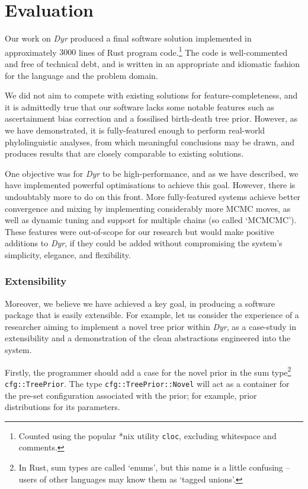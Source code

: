 \documentclass[10pt,journal,compsoc]{IEEEtran}
\begin{document}
\section{Evaluation}

Our work on \textit{Dyr} produced a final software solution implemented in approximately $3000$ lines of Rust program code.\footnote{Counted using the popular *nix utility \texttt{cloc}, excluding whitespace and comments.} The code is well-commented and free of technical debt, and is written in an appropriate and idiomatic fashion for the language and the problem domain.

We did not aim to compete with existing solutions for feature-completeness, and it is admittedly true that our software lacks some notable features such as ascertainment bias correction and a fossilised birth-death tree prior. However, as we have demonstrated, it is fully-featured enough to perform real-world phylolinguistic analyses, from which meaningful conclusions may be drawn, and produces results that are closely comparable to existing solutions.

One objective was for \textit{Dyr} to be high-performance, and as we have described, we have implemented powerful optimisations to achieve this goal. However, there is undoubtably more to do on this front. More fully-featured systems achieve better convergence and mixing by implementing considerably more MCMC moves, as well as dynamic tuning and support for multiple chains (so called `MCMCMC'). These features were out-of-scope for our research but would make positive additions to \textit{Dyr}, if they could be added without compromising the system's simplicity, elegance, and flexibility.

\subsubsection{Extensibility}
Moreover, we believe we have achieved a key goal, in producing a software package that is easily extensible. For example, let us consider the experience of a researcher aiming to implement a novel tree prior within \textit{Dyr}, as a case-study in extensibility and a demonstration of the clean abstractions engineered into the system.

Firstly, the programmer should add a case for the novel prior in the sum type\footnote{In Rust, sum types are called `enums', but this name is a little confusing -- users of other languages may know them as `tagged unions'.} \texttt{cfg::TreePrior}. The type \texttt{cfg::TreePrior::Novel} will act as a container for the pre-set configuration associated with the prior; for example, prior distributions for its parameters.
\end{document}

